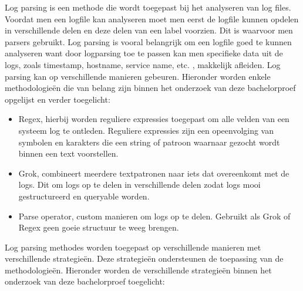 Log parsing is een methode die wordt toegepast bij het analyseren van log files. Voordat men een logfile kan analyseren moet men eerst de logfile kunnen opdelen in verschillende delen en deze delen van een label voorzien. Dit is waarvoor men parsers gebruikt. Log parsing is vooral belangrijk om een logfile goed te kunnen analyseren want door logparsing toe te passen kan men specifieke data uit de logs, zoals timestamp, hostname, service name, etc. \autocite{}, makkelijk afleiden. Log parsing kan op verschillende manieren gebeuren. Hieronder worden enkele methodologieën die van belang zijn binnen het onderzoek van deze bachelorproef opgelijst en verder toegelicht:
\begin{itemize}
    \item Regex, hierbij worden reguliere expressies toegepast om alle velden van een systeem log te ontleden. Reguliere expressies zijn een opeenvolging van symbolen en karakters die een string of patroon waarnaar gezocht wordt binnen een text voorstellen.
    \item Grok, combineert meerdere textpatronen naar iets dat overeenkomt met de logs. Dit om logs op te delen in verschillende delen zodat logs mooi gestructureerd en queryable worden.
    \item Parse operator, custom manieren om logs op te delen. Gebruikt als Grok of Regex geen goeie structuur te weeg brengen.
\end{itemize}
Log parsing methodes worden toegepast op verschillende manieren met verschillende strategieën. Deze strategieën ondersteunen de toepassing van de methodologieën. Hieronder worden de verschillende strategieën binnen het onderzoek van deze bachelorproef toegelicht:
